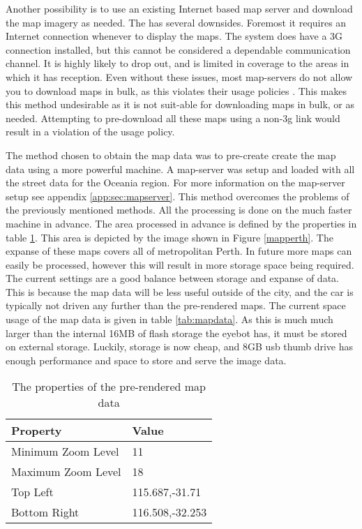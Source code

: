 Another possibility is to use an existing Internet based map server and download the map imagery as needed. The has several downsides. Foremost it requires an Internet connection whenever to display the maps. The system does have a 3G connection installed, but this cannot be considered a dependable communication channel. It is highly likely to drop out, and is limited in coverage to the areas in which it has reception. Even without these issues, most map-servers do not allow you to download maps in bulk, as this violates their usage policies \cite{tile_usage_policy}. This makes this method undesirable as it is not suit-able for downloading maps in bulk, or as needed. Attempting to pre-download all these maps using a non-3g link would result in a violation of the usage policy.

The method chosen to obtain the map data was to pre-create create the map data using a more powerful machine. A map-server was setup and loaded with all the street data for the Oceania region. For more information on the map-server setup see appendix \ref{app:sec:mapserver}. This method overcomes the problems of the previously mentioned methods. All the processing is done on the much faster machine in advance. The area processed in advance is defined by the properties in table \ref{tab:mapbbox}. This area is depicted by the image shown in Figure \ref{mapperth}. The expanse of these maps covers all of metropolitan Perth. In future more maps can easily be processed, however this will result in more storage space being required. The current settings are a good balance between storage and expanse of data. This is because the map data will be less useful outside of the city, and the car is typically not driven any further than the pre-rendered maps. The current space usage of the map data is given in table \ref{tab:mapdata}. As this is much much larger than the internal 16MB of flash storage the eyebot has, it must be stored on external storage. Luckily, storage is now cheap, and 8GB usb thumb drive has enough performance and space to store and serve the image data.

\begin{table}[htdp]
\begin{center}
	
   \begin{tabular}{|l|l|}
        \hline
        Property           & Value           \\ \hline
        Minimum Zoom Level & 11              \\ 
        Maximum Zoom Level & 18              \\ 
        Top Left           & 115.687,-31.71  \\ 
        Bottom Right       & 116.508,-32.253 \\
        \hline
    \end{tabular}
	\caption[Properties of the pre-rendered map data]{The properties of the pre-rendered map data}
	\label{tab:mapbbox} 
\end{center}
\end{table}

